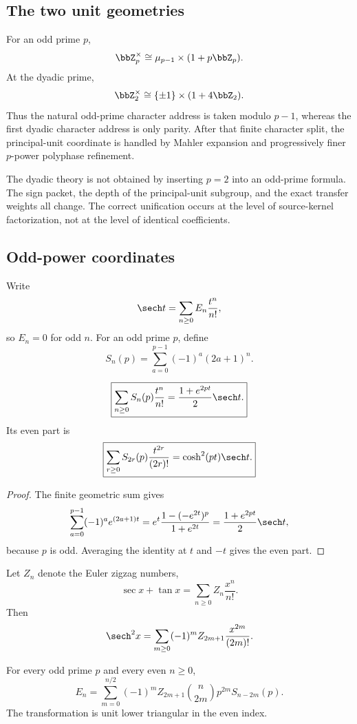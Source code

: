 \subsection{The two unit geometries}
For an odd prime $p$,
\[
 \bbZ_p^\times\cong\mu_{p-1}\times(1+p\bbZ_p).
\]
At the dyadic prime,
\[
 \bbZ_2^\times\cong\{\pm1\}\times(1+4\bbZ_2).
\]
Thus the natural odd-prime character address is taken modulo $p-1$, whereas the first dyadic character address is only parity. After that finite character split, the principal-unit coordinate is handled by Mahler expansion and progressively finer $p$-power polyphase refinement.

\begin{boundary}[No substitution principle at $p=2$]
The dyadic theory is not obtained by inserting $p=2$ into an odd-prime formula. The sign packet, the depth of the principal-unit subgroup, and the exact transfer weights all change. The correct unification occurs at the level of source-kernel factorization, not at the level of identical coefficients.
\end{boundary}

\subsection{Odd-power coordinates}
Write
\[
 \sech t=\sum_{n\geq0}E_n\frac{t^n}{n!},
\]
so $E_n=0$ for odd $n$. For an odd prime $p$, define
\[
 \boxed{S_n(p)=\sum_{a=0}^{p-1}(-1)^a(2a+1)^n.}
\]

\begin{lemma}
\[
 \boxed{\sum_{n\geq0}S_n(p)\frac{t^n}{n!}=\frac{1+e^{2pt}}2\sech t.}
\]
Its even part is
\[
 \boxed{\sum_{r\geq0}S_{2r}(p)\frac{t^{2r}}{(2r)!}=\cosh^2(pt)\sech t.}
\]
\end{lemma}

\begin{proof}
The finite geometric sum gives
\[
 \sum_{a=0}^{p-1}(-1)^ae^{(2a+1)t}
 =e^t\frac{1-(-e^{2t})^p}{1+e^{2t}}
 =\frac{1+e^{2pt}}2\sech t,
\]
because $p$ is odd. Averaging the identity at $t$ and $-t$ gives the even part.
\end{proof}

Let $Z_n$ denote the Euler zigzag numbers,
\[
 \sec x+\tan x=\sum_{n\geq0}Z_n\frac{x^n}{n!}.
\]
Then
\[
 \sech^2x=\sum_{m\geq0}(-1)^mZ_{2m+1}\frac{x^{2m}}{(2m)!}.
\]

\begin{theorem}
For every odd prime $p$ and every even $n\geq0$,
\[
 \boxed{E_n=\sum_{m=0}^{n/2}(-1)^mZ_{2m+1}\binom n{2m}p^{2m}S_{n-2m}(p).}
\]
The transformation is unit lower triangular in the even index.
\end{theorem}

